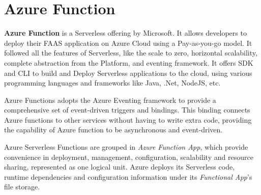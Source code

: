 \documentclass{article}
\begin{document}
\section{Azure Function}
\begin{flushleft}
\textbf{Azure Function} is a Serverless offering by Microsoft. It allows developers to deploy their \gls{FAAS} application on Azure Cloud using a Pay-as-you-go model. It followed all the features of Serverless, like the scale to zero, horizontal scalability, complete abstraction from the Platform, and eventing framework. It offers \gls{SDK} and \gls{CLI} to build and Deploy Serverless applications to the cloud, using various programming languages and frameworks like Java, .Net, NodeJS, etc.

Azure Functions adopts the Azure Eventing framework to provide a comprehensive set of event-driven triggers and bindings. This binding connects Azure functions to other services without having to write extra code, providing the capability of Azure function to be asynchronous and event-driven.

Azure Serverless Functions are grouped in \textit{Azure Function App}, which provide convenience in deployment, management, configuration, scalability and resource sharing, represented as one logical unit. 
Azure deploys its Serverless code, runtime dependencies and configuration information under its \textit{Functional App}'s file storage. 
\end{flushleft}
\pagebreak
\end{document}
